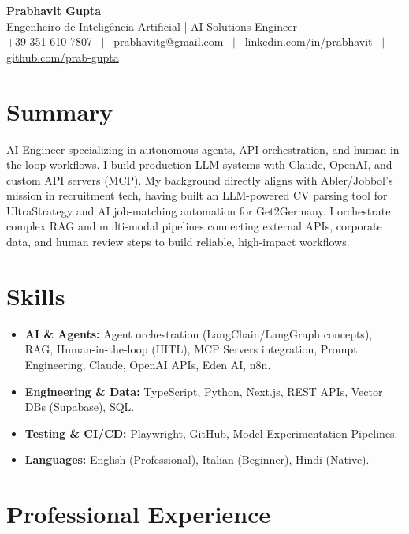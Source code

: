 \documentclass[a4paper,10pt]{article}
\begin{document}
\begin{center}
 {\Huge\bfseries Prabhavit Gupta}\\[3pt]
 {\color{accent}\large Engenheiro de Inteligência Artificial | AI Solutions Engineer}\\[5pt]
 +39 351 610 7807 ~$\vert$~ \href{mailto:prabhavitg@gmail.com}{prabhavitg@gmail.com} ~$\vert$~ \href{https://www.linkedin.com/in/prabhavit/}{linkedin.com/in/prabhavit} ~$\vert$~ \href{https://github.com/prab-gupta}{github.com/prab-gupta}
\end{center}

\section{Summary}
AI Engineer specializing in autonomous agents, API orchestration, and human-in-the-loop workflows. I build production LLM systems with Claude, OpenAI, and custom API servers (MCP). My background directly aligns with Abler/Jobbol's mission in recruitment tech, having built an LLM-powered CV parsing tool for UltraStrategy and AI job-matching automation for Get2Germany. I orchestrate complex RAG and multi-modal pipelines connecting external APIs, corporate data, and human review steps to build reliable, high-impact workflows.

\section{Skills}
\begin{itemize}
 \item \textbf{AI \& Agents:} Agent orchestration (LangChain/LangGraph concepts), RAG, Human-in-the-loop (HITL), MCP Servers integration, Prompt Engineering, Claude, OpenAI APIs, Eden AI, n8n.
 \item \textbf{Engineering \& Data:} TypeScript, Python, Next.js, REST APIs, Vector DBs (Supabase), SQL.
 \item \textbf{Testing \& CI/CD:} Playwright, GitHub, Model Experimentation Pipelines.
 \item \textbf{Languages:} English (Professional), Italian (Beginner), Hindi (Native).
\end{itemize}

\section{Professional Experience}
\end{document}

